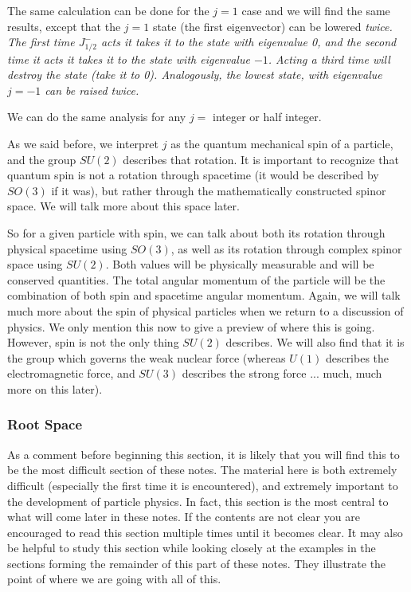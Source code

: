 \documentclass[12pt,epsf]{article}
\begin{document}
The same calculation can be done for the $j=1$ case and we will find
the same results, except that the $j=1$ state (the first eigenvector)
can be lowered \it twice\rm.  The first time $J^-_{1/2}$ acts it takes
it to the state with eigenvalue 0, and the second time it acts it
takes it to the state with eigenvalue $-1$.  Acting a third time will
destroy the state (take it to 0).  Analogously, the lowest state,
with eigenvalue $j=-1$ can be raised twice.  

We can do the same analysis for any $j=$ integer or half integer.  

As we said before, we interpret $j$ as the quantum mechanical spin of a
particle, and the group $SU(2)$ describes that rotation.  It is
important to recognize that quantum spin is not a rotation through
spacetime (it would be described by $SO(3)$ if it was), but rather
through the mathematically constructed spinor space.  We will talk more
about this space later.  

So for a given particle with spin, we can talk about both its rotation
through physical spacetime using $SO(3)$, as well as its rotation
through complex spinor space using $SU(2)$.   Both values will be
physically measurable and will be conserved quantities.  The total
angular momentum of the particle will be the combination of both spin
and spacetime angular momentum.  Again, we will talk much more about
the spin of physical particles when we return to a discussion of
physics.  We only mention this now to give a preview of where this is
going.	However, spin is not the only thing $SU(2)$ describes.	We will
also find that it is the group which governs the weak nuclear force
(whereas $U(1)$ describes the electromagnetic force, and $SU(3)$
describes the strong force ... much, much more on this later).	

\subsubsection{Root Space}
\label{sec:rootspace}

As a comment before beginning this section, it is likely that you will
find this to be the most difficult section of these notes.  The
material here is both extremely difficult (especially the first time it
is encountered), and extremely important to the development of particle
physics.  In fact, this section is the most central to what will come
later in these notes.  If the contents are not clear you are encouraged
to read this section multiple times until it becomes clear.  It may
also be helpful to study this section while looking closely at the
examples in the sections forming the remainder of this part of these
notes.	They illustrate the point of where we are going with all of
this.  
\end{document}
